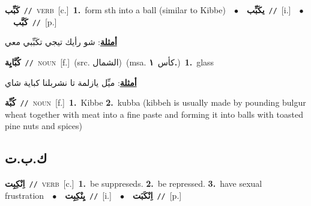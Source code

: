\documentclass[10pt,a4paper,twoside]{article} %
\begin{document}
\begin{multicols}{2}
{{{{{{\setlength\topsep{0pt}\textbf{\foreignlanguage{arabic}{كَبِّب}}\ {\color{gray}\texttt{//}\color{black}}\ \textsc{verb}\ [c.]\ \textbf{1.}~form sth into a ball (similar to Kibbe)\ \ $\bullet$\ \ \setlength\topsep{0pt}\textbf{\foreignlanguage{arabic}{يكَبِّب}}\ {\color{gray}\texttt{//}\color{black}}\ [i.]\ \ $\bullet$\ \ \setlength\topsep{0pt}\textbf{\foreignlanguage{arabic}{كَبَّب}}\ {\color{gray}\texttt{//}\color{black}}\ [p.]\  \begin{flushright}\color{gray}\foreignlanguage{arabic}{\textbf{\underline{\foreignlanguage{arabic}{أمثلة}}}: شو رأيك تيجي تكَبِّبي معي}\end{flushright}\color{black}} \vspace{2mm}

{\setlength\topsep{0pt}\textbf{\foreignlanguage{arabic}{كُبَّايِة}}\ {\color{gray}\texttt{//}\color{black}}\ \textsc{noun}\ [f.]\ (src. \color{gray}\foreignlanguage{arabic}{الشمال}\color{black})\ \color{gray}(msa. \foreignlanguage{arabic}{كأس}~\foreignlanguage{arabic}{\textbf{١.}})\color{black}\ \textbf{1.}~glass\  \begin{flushright}\color{gray}\foreignlanguage{arabic}{\textbf{\underline{\foreignlanguage{arabic}{أمثلة}}}: ميِّل يازلمة تا نشربلنا كباية شاي}\end{flushright}\color{black}} \vspace{2mm}

{\setlength\topsep{0pt}\textbf{\foreignlanguage{arabic}{كُبِّة}}\ {\color{gray}\texttt{//}\color{black}}\ \textsc{noun}\ [f.]\ \textbf{1.}~Kibbe  \textbf{2.}~kubba (kibbeh is usually made by pounding bulgur wheat together with meat into a fine paste and forming it into balls with toasted pine nuts and spices)\ 

\vspace{-3mm}
\subsection*{\color{blue}\foreignlanguage{arabic}{ك.ب.ت}\color{blue}{}} 

{\setlength\topsep{0pt}\textbf{\foreignlanguage{arabic}{اِنْكِبِت}}\ {\color{gray}\texttt{//}\color{black}}\ \textsc{verb}\ [c.]\ \textbf{1.}~be suppreseds.  \textbf{2.}~be repressed.  \textbf{3.}~have sexual frustration\ \ $\bullet$\ \ \setlength\topsep{0pt}\textbf{\foreignlanguage{arabic}{يِنْكِبِت}}\ {\color{gray}\texttt{//}\color{black}}\ [i.]\ \ $\bullet$\ \ \setlength\topsep{0pt}\textbf{\foreignlanguage{arabic}{اِنْكَبَت}}\ {\color{gray}\texttt{//}\color{black}}\ [p.]\ 

}}}}}}}
\end{multicols}
\end{document}
